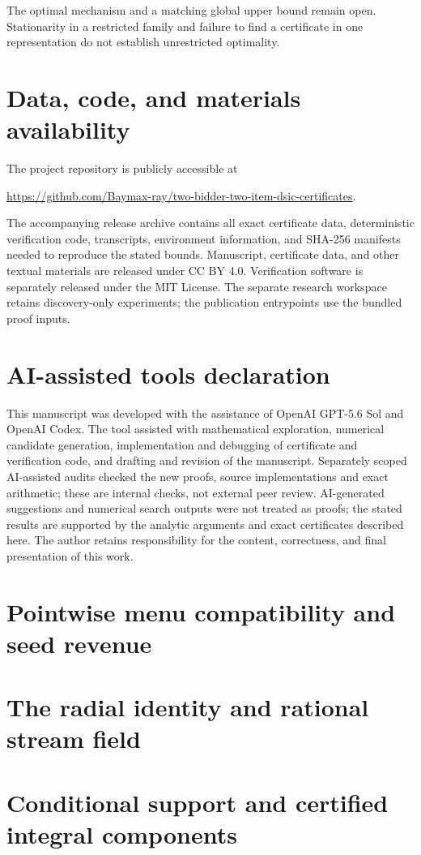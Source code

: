 \documentclass[11pt]{article}
\begin{document}
The optimal mechanism and a matching global upper bound remain open.
Stationarity in a restricted family and failure to find a certificate in
one representation do not establish unrestricted optimality.

\section*{Data, code, and materials availability}

The project repository is publicly accessible at
\begin{center}\small
\url{https://github.com/Baymax-ray/two-bidder-two-item-dsic-certificates}.
\end{center}
The accompanying release archive contains all exact certificate data, deterministic
verification code, transcripts, environment information, and SHA-256
manifests needed to reproduce the stated bounds.  Manuscript, certificate
data, and other textual materials are released under CC BY 4.0.  Verification
software is separately released under the MIT License.  The separate research workspace retains discovery-only experiments; the
publication entrypoints use the bundled proof inputs.

\section*{AI-assisted tools declaration}

This manuscript was developed with the assistance of OpenAI GPT-5.6 Sol and OpenAI Codex.
The tool assisted with mathematical exploration, numerical candidate
generation, implementation and debugging of certificate and verification
code, and drafting and revision of the manuscript. Separately scoped AI-assisted
audits checked the new proofs, source implementations and exact arithmetic;
these are internal checks, not external peer review. AI-generated suggestions
and numerical search outputs were not treated as proofs; the stated results
are supported by the analytic arguments and exact certificates described
here.  The author retains responsibility for the content, correctness, and
final presentation of this work.


\appendix
\section{Pointwise menu compatibility and seed revenue}\label{app:compatibility}


\section{The radial identity and rational stream field}\label{app:stream}


\section{Conditional support and certified integral components}\label{app:integration}



\begingroup
\small
\sloppy
\raggedright

\endgroup
\end{document}
